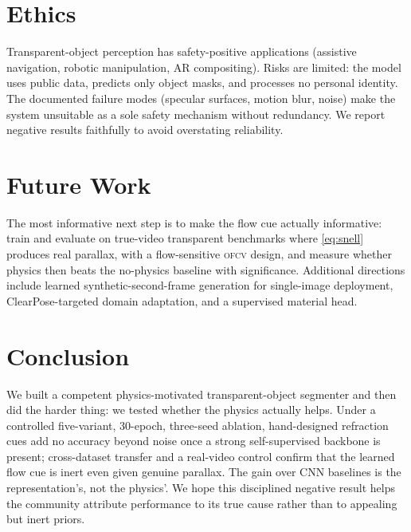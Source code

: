 \documentclass[conference]{IEEEtran}
\newcommand{\ofcv}{\textsc{ofcv}}
\begin{document}
\section{Ethics}
Transparent-object perception has safety-positive applications (assistive
navigation, robotic manipulation, AR compositing). Risks are limited: the model
uses public data, predicts only object masks, and processes no personal
identity. The documented failure modes (specular surfaces, motion blur, noise)
make the system unsuitable as a sole safety mechanism without redundancy. We
report negative results faithfully to avoid overstating reliability.

\section{Future Work}
The most informative next step is to make the flow cue actually informative:
train and evaluate on true-video transparent benchmarks where \eqref{eq:snell}
produces real parallax, with a flow-sensitive \ofcv{} design, and measure
whether physics then beats the no-physics baseline with significance. Additional
directions include learned synthetic-second-frame generation for single-image
deployment, ClearPose-targeted domain adaptation, and a supervised material head.

\section{Conclusion}
We built a competent physics-motivated transparent-object segmenter and then did
the harder thing: we tested whether the physics actually helps. Under a
controlled five-variant, 30-epoch, three-seed ablation, hand-designed refraction
cues add no accuracy beyond noise once a strong self-supervised backbone is
present; cross-dataset transfer and a real-video control confirm that the
learned flow cue is inert even given genuine parallax. The gain over CNN
baselines is the representation's, not the physics'. We hope this disciplined
negative result helps the community attribute performance to its true cause
rather than to appealing but inert priors.
\end{document}
